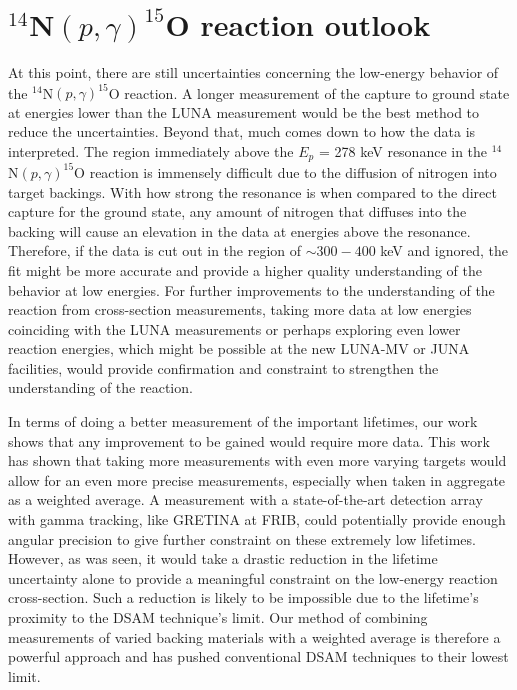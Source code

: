 \section{$^{14}$N$\left( p,\gamma \right) ^{15}$O reaction outlook}
\label{sec: outlook}

At this point, there are still uncertainties concerning the low-energy behavior of the $^{14}$N$\left( p,\gamma \right) ^{15}$O reaction. A longer measurement of the capture to ground state at energies lower than the LUNA measurement would be the best method to reduce the uncertainties. Beyond that, much comes down to how the data is interpreted. The region immediately above the $E_{p}$ = 278 keV resonance in the $^{14}$N$\left( p,\gamma \right) ^{15}$O reaction is immensely difficult due to the diffusion of nitrogen into target backings. With how strong the resonance is when compared to the direct capture for the ground state, any amount of nitrogen that diffuses into the backing will cause an elevation in the data at energies above the resonance. Therefore, if the data is cut out in the region of $\sim 300 - 400$ keV and ignored, the fit might be more accurate and provide a higher quality understanding of the behavior at low energies. For further improvements to the understanding of the reaction from cross-section measurements, taking more data at low energies coinciding with the LUNA measurements or perhaps exploring even lower reaction energies, which might be possible at the new LUNA-MV or JUNA facilities, would provide confirmation and constraint to strengthen the understanding of the reaction. 

In terms of doing a better measurement of the important lifetimes, our work shows that any improvement to be gained would require more data. This work has shown that taking more measurements with even more varying targets would allow for an even more precise measurements, especially when taken in aggregate as a weighted average. A measurement with a state-of-the-art detection array with gamma tracking, like GRETINA at FRIB, could potentially provide enough angular precision to give further constraint on these extremely low lifetimes. However, as was seen, it would take a drastic reduction in the lifetime uncertainty alone to provide a meaningful constraint on the low-energy reaction cross-section. Such a reduction is likely to be impossible due to the lifetime's proximity to the DSAM technique's limit. Our method of combining measurements of varied backing materials with a weighted average is therefore a powerful approach and has pushed conventional DSAM techniques to their lowest limit. 



%
% 
% 
